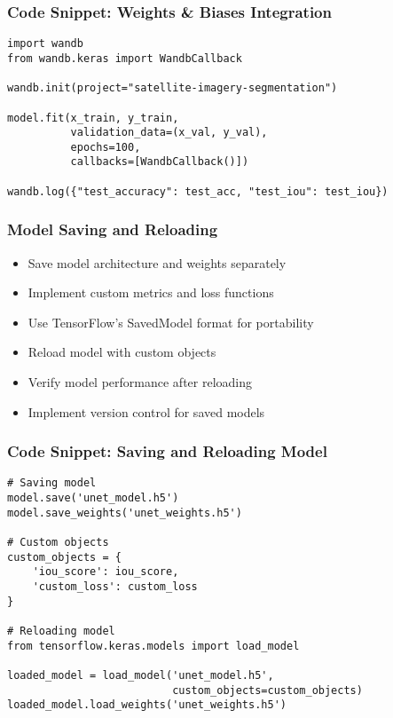 \begin{frame}[fragile]\frametitle{Code Snippet: Weights \& Biases Integration}
\begin{lstlisting}
import wandb
from wandb.keras import WandbCallback

wandb.init(project="satellite-imagery-segmentation")

model.fit(x_train, y_train,
          validation_data=(x_val, y_val),
          epochs=100,
          callbacks=[WandbCallback()])

wandb.log({"test_accuracy": test_acc, "test_iou": test_iou})
\end{lstlisting}
\end{frame}

\begin{frame}[fragile]\frametitle{Model Saving and Reloading}
\begin{itemize}
\item Save model architecture and weights separately
\item Implement custom metrics and loss functions
\item Use TensorFlow's SavedModel format for portability
\item Reload model with custom objects
\item Verify model performance after reloading
\item Implement version control for saved models
\end{itemize}
\end{frame}

\begin{frame}[fragile]\frametitle{Code Snippet: Saving and Reloading Model}
\begin{lstlisting}
# Saving model
model.save('unet_model.h5')
model.save_weights('unet_weights.h5')

# Custom objects
custom_objects = {
    'iou_score': iou_score,
    'custom_loss': custom_loss
}

# Reloading model
from tensorflow.keras.models import load_model

loaded_model = load_model('unet_model.h5', 
                          custom_objects=custom_objects)
loaded_model.load_weights('unet_weights.h5')
\end{lstlisting}
\end{frame}

